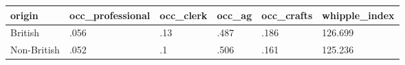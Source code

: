 \documentclass{article}
\begin{document}
\begin{table}[tbp] \centering
{}

\begin{tabularx}{\linewidth}{lCCCCC}

\toprule
{origin}&{occ\_professional}&{occ\_clerk}&{occ\_ag}&{occ\_crafts}&{whipple\_index} \tabularnewline
\midrule \addlinespace[\belowrulesep]
British&.056&.13&.487&.186&126.699 \tabularnewline
Non-British&.052&.1&.506&.161&125.236 \tabularnewline
\bottomrule 

\end{tabularx}
\end{table}
\end{document}

